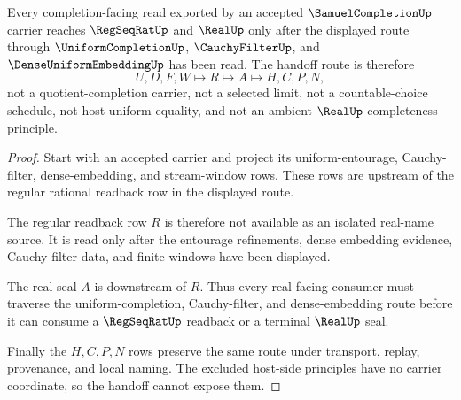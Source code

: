 \begin{theorem}
\label{thm:samuel-completion-uniform-handoff}
Every completion-facing read exported by an accepted $\SamuelCompletionUp$ carrier reaches $\RegSeqRatUp$ and $\RealUp$ only after the displayed route through $\UniformCompletionUp$, $\CauchyFilterUp$, and $\DenseUniformEmbeddingUp$ has been read. The handoff route is therefore
$$
U,D,F,W \longmapsto R \longmapsto A \longmapsto H,C,P,N ,
$$
not a quotient-completion carrier, not a selected limit, not a countable-choice schedule, not host uniform equality, and not an ambient $\RealUp$ completeness principle.
\end{theorem}
\begin{proof}
Start with an accepted carrier and project its uniform-entourage, Cauchy-filter, dense-embedding, and stream-window rows. These rows are upstream of the regular rational readback row in the displayed route.

The regular readback row $R$ is therefore not available as an isolated real-name source. It is read only after the entourage refinements, dense embedding evidence, Cauchy-filter data, and finite windows have been displayed.

The real seal $A$ is downstream of $R$. Thus every real-facing consumer must traverse the uniform-completion, Cauchy-filter, and dense-embedding route before it can consume a $\RegSeqRatUp$ readback or a terminal $\RealUp$ seal.

Finally the $H,C,P,N$ rows preserve the same route under transport, replay, provenance, and local naming. The excluded host-side principles have no carrier coordinate, so the handoff cannot expose them.
\end{proof}


\begin{closurestatus}{\SamuelCompletionUp}
  \theoryclosure{\seedClosure}
  \formalstatus{\unformalizedV}
\end{closurestatus}
